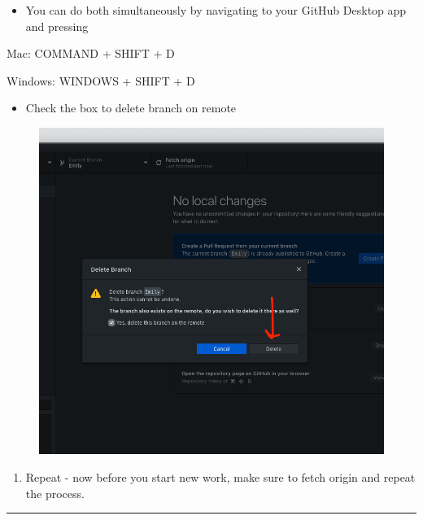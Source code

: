 \documentclass[]{book}
\providecommand{\tightlist}{%
  \setlength{\itemsep}{0pt}\setlength{\parskip}{0pt}}
\begin{document}
\begin{itemize}
\tightlist
\item
  You can do both simultaneously by navigating to your GitHub Desktop app and pressing
\end{itemize}

Mac: COMMAND + SHIFT + D

Windows: WINDOWS + SHIFT + D

\begin{itemize}
\tightlist
\item
  Check the box to delete branch on remote
\end{itemize}

\begin{figure}
\centering
\includegraphics{images/research_protocols/github/31.png}
\caption{}
\end{figure}

\begin{enumerate}
\def\labelenumi{\arabic{enumi}.}
\setcounter{enumi}{9}
\tightlist
\item
  Repeat - now before you start new work, make sure to fetch origin and repeat the process.
\end{enumerate}

\begin{center}\rule{0.5\linewidth}{0.5pt}\end{center}
\end{document}
